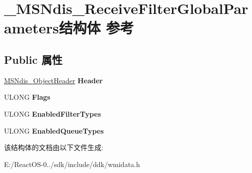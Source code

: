 \hypertarget{struct___m_s_ndis___receive_filter_global_parameters}{}\section{\+\_\+\+M\+S\+Ndis\+\_\+\+Receive\+Filter\+Global\+Parameters结构体 参考}
\label{struct___m_s_ndis___receive_filter_global_parameters}
\subsection*{Public 属性}
\begin{DoxyCompactItemize}
\item 
\mbox{\label{struct___m_s_ndis___receive_filter_global_parameters_adee73842df20b0b889bd85c016a06f7d}} 
\hyperlink{struct___m_s_ndis___object_header}{M\+S\+Ndis\+\_\+\+Object\+Header} {\bfseries Header}
\item 
\mbox{\label{struct___m_s_ndis___receive_filter_global_parameters_a6a62c21ed3ded2fc8d1eea852f94d6ab}} 
U\+L\+O\+NG {\bfseries Flags}
\item 
\mbox{\label{struct___m_s_ndis___receive_filter_global_parameters_a254d812e86cd7a2a300d862b3a0db0d1}} 
U\+L\+O\+NG {\bfseries Enabled\+Filter\+Types}
\item 
\mbox{\label{struct___m_s_ndis___receive_filter_global_parameters_a0ae8363a5a7bc7cd023627691abbfb3c}} 
U\+L\+O\+NG {\bfseries Enabled\+Queue\+Types}
\end{DoxyCompactItemize}


该结构体的文档由以下文件生成\+:\begin{DoxyCompactItemize}
\item 
E\+:/\+React\+O\+S-\/0../sdk/include/ddk/wmidata.\+h\end{DoxyCompactItemize}
